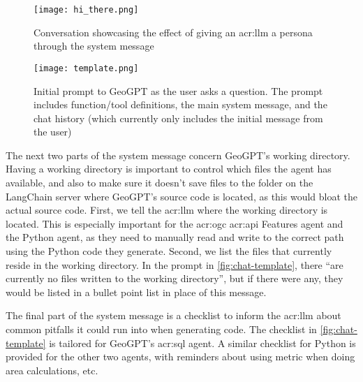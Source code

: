 \begin{figure}[H]
    \centering
    \texttt{[image: hi\_there.png]}
    \caption[LLM persona example]{Conversation showcasing the effect of giving an \acrshort{acr:llm} a persona through the system message}
    \label{fig:effect-of-system-message}
\end{figure}

\begin{figure}
    \centering
    \texttt{[image: template.png]}
    \caption[Initial prompt to GeoGPT as the user asks a question]{Initial prompt to GeoGPT as the user asks a question. The prompt includes function/tool definitions, the main system message, and the chat history (which currently only includes the initial message from the user)}
    \label{fig:chat-template}
\end{figure}

The next two parts of the system message concern GeoGPT's working directory. Having a working directory is important to control which files the agent has available, and also to make sure it doesn't save files to the folder on the LangChain server where GeoGPT's source code is located, as this would bloat the actual source code. First, we tell the \acrshort{acr:llm} where the working directory is located. This is especially important for the \acrshort{acr:ogc} \acrshort{acr:api} Features agent and the Python agent, as they need to manually read and write to the correct path using the Python code they generate. Second, we list the files that currently reside in the working directory. In the prompt in \autoref{fig:chat-template}, there \enquote{are currently no files written to the working directory}, but if there were any, they would be listed in a bullet point list in place of this message.

The final part of the system message is a checklist to inform the \acrshort{acr:llm} about common pitfalls it could run into when generating code. The checklist in \autoref{fig:chat-template} is tailored for GeoGPT's \acrshort{acr:sql} agent. A similar checklist for Python is provided for the other two agents, with reminders about using metric  when doing area calculations, etc.

